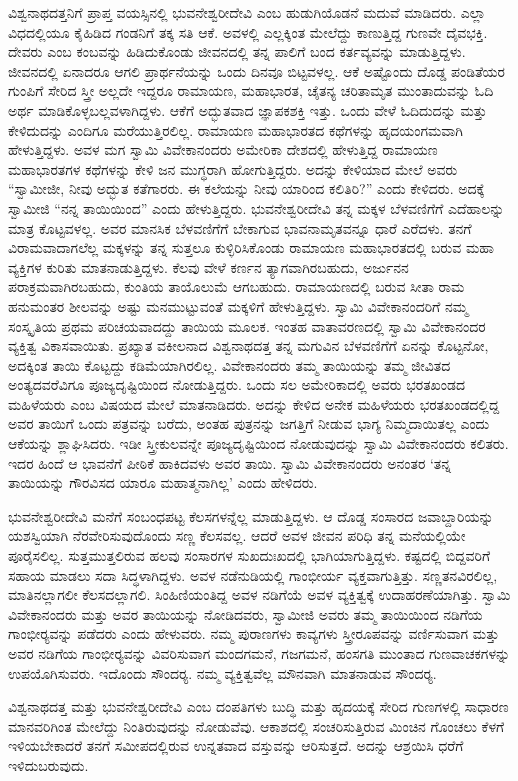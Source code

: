 ವಿಶ್ವನಾಥದತ್ತನಿಗೆ ಪ್ರಾಪ್ತ ವಯಸ್ಸಿನಲ್ಲಿ ಭುವನೇಶ್ವರೀದೇವಿ ಎಂಬ ಹುಡುಗಿ\-ಯೊಡನೆ ಮದುವೆ ಮಾಡಿದರು. ಎಲ್ಲಾ ವಿಧದಲ್ಲಿಯೂ ಕೈಹಿಡಿದ ಗಂಡನಿಗೆ ತಕ್ಕ ಸತಿ ಆಕೆ. ಅವಳಲ್ಲಿ ಎಲ್ಲಕ್ಕಿಂತ ಮೇಲೆದ್ದು ಕಾಣುತ್ತಿದ್ದ ಗುಣವೇ ದೈವಭಕ್ತಿ. ದೇವರು ಎಂಬ ಕಂಬವನ್ನು ಹಿಡಿದುಕೊಂಡು ಜೀವನದಲ್ಲಿ ತನ್ನ ಪಾಲಿಗೆ ಬಂದ ಕರ್ತವ್ಯವನ್ನು ಮಾಡುತ್ತಿದ್ದಳು. ಜೀವನದಲ್ಲಿ ಏನಾದರೂ ಆಗಲಿ ಪ್ರಾರ್ಥನೆಯನ್ನು ಒಂದು ದಿನವೂ ಬಿಟ್ಟವಳಲ್ಲ. ಆಕೆ ಅಷ್ಟೊಂದು ದೊಡ್ಡ ಪಂಡಿತೆಯರ ಗುಂಪಿಗೆ ಸೇರಿದ ಸ್ತ್ರೀ ಅಲ್ಲದೇ ಇದ್ದರೂ ರಾಮಾಯಣ, ಮಹಾಭಾರತ, ಚೈತನ್ಯ ಚರಿತಾಮೃತ ಮುಂತಾದುವನ್ನು ಓದಿ ಅರ್ಥ ಮಾಡಿಕೊಳ್ಳಬಲ್ಲವಳಾಗಿದ್ದಳು. ಆಕೆಗೆ ಅದ್ಭುತವಾದ ಜ್ಞಾಪಕಶಕ್ತಿ ಇತ್ತು. ಒಂದು ವೇಳೆ ಓದಿದುದನ್ನು ಮತ್ತು ಕೇಳಿದುದನ್ನು ಎಂದಿಗೂ ಮರೆಯುತ್ತಿರಲಿಲ್ಲ. ರಾಮಾಯಣ ಮಹಾಭಾರತದ ಕಥೆಗಳನ್ನು ಹೃದಯಂಗಮವಾಗಿ ಹೇಳುತ್ತಿದ್ದಳು. ಅವಳ ಮಗ ಸ್ವಾಮಿ ವಿವೇಕಾನಂದರು ಅಮೇರಿಕಾ ದೇಶದಲ್ಲಿ ಹೇಳುತ್ತಿದ್ದ ರಾಮಾಯಣ ಮಹಾಭಾರತಗಳ ಕಥೆಗಳನ್ನು ಕೇಳಿ ಜನ ಮುಗ್ಧರಾಗಿ ಹೋಗುತ್ತಿದ್ದರು. ಅದನ್ನು ಕೇಳಿಯಾದ ಮೇಲೆ ಅವರು “ಸ್ವಾಮೀಜೀ, ನೀವು ಅದ್ಭುತ ಕತೆಗಾರರು. ಈ ಕಲೆಯನ್ನು ನೀವು ಯಾರಿಂದ ಕಲಿತಿರಿ?” ಎಂದು ಕೇಳಿದರು. ಅದಕ್ಕೆ ಸ್ವಾಮೀಜಿ “ನನ್ನ ತಾಯಿಯಿಂದ” ಎಂದು ಹೇಳುತ್ತಿದ್ದರು. ಭುವನೇಶ್ವರೀದೇವಿ ತನ್ನ ಮಕ್ಕಳ ಬೆಳವಣಿಗೆಗೆ ಎದೆಹಾಲನ್ನು ಮಾತ್ರ ಕೊಟ್ಟವಳಲ್ಲ. ಅವರ ಮಾನಸಿಕ ಬೆಳವಣಿಗೆಗೆ ಬೇಕಾಗುವ ಭಾವನಾಮೃತವನ್ನೂ ಧಾರೆ ಎರೆದಳು. ತನಗೆ ವಿರಾಮವಾದಾಗಲೆಲ್ಲ ಮಕ್ಕಳನ್ನು ತನ್ನ ಸುತ್ತಲೂ ಕುಳ್ಳಿರಿಸಿಕೊಂಡು ರಾಮಾಯಣ ಮಹಾಭಾರತದಲ್ಲಿ ಬರುವ ಮಹಾ ವ್ಯಕ್ತಿಗಳ ಕುರಿತು ಮಾತನಾಡುತ್ತಿದ್ದಳು. ಕೆಲವು ವೇಳೆ ಕರ್ಣನ ತ್ಯಾಗವಾಗಿರಬಹುದು, ಅರ್ಜುನನ ಪರಾಕ್ರಮವಾಗಿರಬಹುದು, ಕುಂತಿಯ ತಾಯೊಲುಮೆ ಆಗಬಹುದು. ರಾಮಾಯಣ\-ದಲ್ಲಿ ಬರುವ ಸೀತಾ ರಾಮ ಹನುಮಂತರ ಶೀಲವನ್ನು ಅಷ್ಟು ಮನಮುಟ್ಟುವಂತೆ ಮಕ್ಕಳಿಗೆ ಹೇಳುತ್ತಿದ್ದಳು. ಸ್ವಾಮಿ ವಿವೇಕಾನಂದರಿಗೆ ನಮ್ಮ ಸಂಸ್ಕೃತಿಯ ಪ್ರಥಮ ಪರಿಚಯವಾದದ್ದು ತಾಯಿಯ ಮೂಲಕ. ಇಂತಹ ವಾತಾವರಣದಲ್ಲಿ ಸ್ವಾಮಿ ವಿವೇಕಾನಂದರ ವ್ಯಕ್ತಿತ್ವ ವಿಕಾಸವಾಯಿತು. ಪ್ರಖ್ಯಾತ ವಕೀಲನಾದ ವಿಶ್ವನಾಥದತ್ತ ತನ್ನ ಮಗುವಿನ ಬೆಳವಣಿಗೆಗೆ ಏನನ್ನು ಕೊಟ್ಟನೋ, ಅದಕ್ಕಿಂತ ತಾಯಿ ಕೊಟ್ಟದ್ದು ಕಡಿಮೆಯಾಗಿರಲಿಲ್ಲ. ವಿವೇಕಾನಂದರು ತಮ್ಮ ತಾಯಿಯನ್ನು ತಮ್ಮ ಜೀವಿತದ ಅಂತ್ಯದ\-ವರೆವಿಗೂ ಪೂಜ್ಯದೃಷ್ಟಿಯಿಂದ ನೋಡುತ್ತಿದ್ದರು. ಒಂದು ಸಲ ಅಮೇರಿಕಾದಲ್ಲಿ ಅವರು ಭರತಖಂಡದ ಮಹಿಳೆಯರು ಎಂಬ ವಿಷಯದ ಮೇಲೆ ಮಾತನಾಡಿದರು. ಅದನ್ನು ಕೇಳಿದ ಅನೇಕ ಮಹಿಳೆಯರು ಭರತಖಂಡದಲ್ಲಿದ್ದ ಅವರ ತಾಯಿಗೆ ಒಂದು ಪತ್ರವನ್ನು ಬರೆದು, ಅಂತಹ ಪುತ್ರನನ್ನು ಜಗತ್ತಿಗೆ ನೀಡುವ ಭಾಗ್ಯ ನಿಮ್ಮದಾಯಿತಲ್ಲ ಎಂದು ಆಕೆಯನ್ನು ಶ್ಲಾಘಿಸಿದರು. ಇಡೀ ಸ್ತ್ರೀಕುಲವನ್ನೇ ಪೂಜ್ಯದೃಷ್ಟಿಯಿಂದ ನೋಡುವುದನ್ನು ಸ್ವಾಮಿ ವಿವೇಕಾನಂದರು ಕಲಿತರು. ಇದರ ಹಿಂದೆ ಆ ಭಾವನೆಗೆ ಪೀಠಿಕೆ ಹಾಕಿದವಳು ಅವರ ತಾಯಿ. ಸ್ವಾಮಿ ವಿವೇಕಾನಂದರು ಅನಂತರ ‘ತನ್ನ ತಾಯಿಯನ್ನು ಗೌರವಿಸದ ಯಾರೂ ಮಹಾತ್ಮನಾಗಿಲ್ಲ’ ಎಂದು ಹೇಳಿದರು.

ಭುವನೇಶ್ವರೀದೇವಿ ಮನೆಗೆ ಸಂಬಂಧಪಟ್ಟ ಕೆಲಸಗಳನ್ನೆಲ್ಲ ಮಾಡುತ್ತಿದ್ದಳು. ಆ ದೊಡ್ಡ ಸಂಸಾರದ ಜವಾಬ್ದಾರಿಯನ್ನು ಯಶಸ್ವಿಯಾಗಿ ನೆರವೇರಿಸುವುದೊಂದು ಸಣ್ಣ ಕೆಲಸವಲ್ಲ. ಆದರೆ ಅವಳ ಜೀವನ ಪರಿಧಿ ತನ್ನ ಮನೆಯಲ್ಲಿಯೇ ಪೂರೈಸಲಿಲ್ಲ. ಸುತ್ತಮುತ್ತಲಿರುವ ಹಲವು ಸಂಸಾರಗಳ ಸುಖದುಃಖದಲ್ಲಿ ಭಾಗಿಯಾಗುತ್ತಿದ್ದಳು. ಕಷ್ಟದಲ್ಲಿ ಬಿದ್ದವರಿಗೆ ಸಹಾಯ ಮಾಡಲು ಸದಾ ಸಿದ್ಧಳಾಗಿದ್ದಳು. ಅವಳ ನಡೆನುಡಿಯಲ್ಲಿ ಗಾಂಭೀರ್ಯ ವ್ಯಕ್ತವಾಗುತ್ತಿತ್ತು. ಸಣ್ಣತನವಿರಲಿಲ್ಲ, ಮಾತಿನಲ್ಲಾಗಲೀ ಕೆಲಸದಲ್ಲಾಗಲಿ. ಸಿಂಹಿಣಿಯಂತಿದ್ದ ಅವಳ ನಡಿಗೆಯೆ ಅವಳ ವ್ಯಕ್ತಿತ್ವಕ್ಕೆ ಉದಾಹರಣೆಯಾಗಿತ್ತು. ಸ್ವಾಮಿ ವಿವೇಕಾನಂದರು ಮತ್ತು ಅವರ ತಾಯಿಯನ್ನು ನೋಡಿದವರು, ಸ್ವಾಮೀಜಿ ಅವರು ತಮ್ಮ ತಾಯಿಯಿಂದ ನಡಿಗೆಯ ಗಾಂಭೀರ‍್ಯವನ್ನು ಪಡೆದರು ಎಂದು ಹೇಳುವರು. ನಮ್ಮ ಪುರಾಣಗಳು ಕಾವ್ಯಗಳು ಸ್ತ್ರೀರೂಪವನ್ನು ವರ್ಣಿಸುವಾಗ ಮತ್ತು ಅವರ ನಡಿಗೆಯ ಗಾಂಭೀರ‍್ಯವನ್ನು ವಿವರಿಸುವಾಗ ಮಂದಗಮನೆ, ಗಜಗಮನೆ, ಹಂಸಗತಿ ಮುಂತಾದ ಗುಣವಾಚಕಗಳನ್ನು ಉಪಯೊಗಿಸುವರು. ಇದೊಂದು ಸೌಂದರ‍್ಯ. ನಮ್ಮ ವ್ಯಕ್ತಿತ್ವವೆಲ್ಲ ಮೌನವಾಗಿ ಮಾತನಾಡುವ ಸೌಂದರ‍್ಯ.

ವಿಶ್ವನಾಥದತ್ತ ಮತ್ತು ಭುವನೇಶ್ವರೀದೇವಿ ಎಂಬ ದಂಪತಿಗಳು ಬುದ್ಧಿ ಮತ್ತು ಹೃದಯಕ್ಕೆ ಸೇರಿದ ಗುಣಗಳಲ್ಲಿ ಸಾಧಾರಣ ಮಾನವರಿಗಿಂತ ಮೇಲೆದ್ದು ನಿಂತಿರುವುದನ್ನು ನೋಡುವೆವು. ಆಕಾಶದಲ್ಲಿ ಸಂಚರಿಸುತ್ತಿರುವ ಮಿಂಚಿನ ಗೊಂಚಲು ಕೆಳಗೆ ಇಳಿಯಬೇಕಾದರೆ ತನಗೆ ಸಮೀಪದಲ್ಲಿರುವ ಉನ್ನತವಾದ ವಸ್ತುವನ್ನು ಆರಿಸುತ್ತದೆ. ಅದನ್ನು ಆಶ್ರಯಿಸಿ ಧರೆಗೆ ಇಳಿದುಬರುವುದು.

